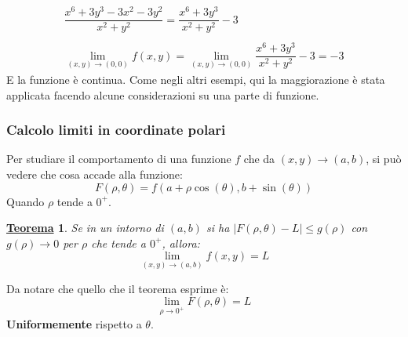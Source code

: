 \documentclass[a4paper]{article}
\newtheorem{theorem}{\textcolor{Red3}{\underline{Teorema}}}
\begin{document}
	\begin{gather*}
		\dfrac{
				x^{6} + 3y^{3} - 3x^{2} - 3y^{2}
		}{x^{2}+y^{2}} = \dfrac{x^{6} + 3y^{3}}{x^{2}+y^{2}} - 3 \\ \\
		\displaystyle\lim_{\left(x,y\right) \rightarrow \left(0,0\right)} f\left(x,y\right) = \displaystyle\lim_{\left(x,y\right) \rightarrow \left(0,0\right)}\dfrac{x^{6} + 3y^{3}}{x^{2}+y^{2}} - 3 = -3
	\end{gather*}
	E la funzione è continua. Come negli altri esempi, qui la maggiorazione è stata applicata facendo alcune considerazioni su una parte di funzione.\newpage

	\subsubsection{Calcolo limiti in coordinate polari}\label{subsubsection: calcolo limiti in coordinate polari}

	Per studiare il comportamento di una funzione $f$ che da $\left(x,y\right) \rightarrow \left(a,b\right)$, si può vedere che cosa accade alla funzione:
	\begin{equation}
		F\left(\rho, \theta\right) = f\left(a + \rho\cos\left(\theta\right), b + \sin\left(\theta\right)\right)
	\end{equation}
	Quando $\rho$ tende a $0^{+}$.
	\begin{theorem}
		Se in un intorno di $\left(a,b\right)$ si ha $\left| F\left(\rho, \theta\right) - L \right| \le g\left(\rho\right)$ con $g\left(\rho\right) \rightarrow 0$ per $\rho$ che tende a $0^{+}$, allora:
		\begin{equation}
			\displaystyle\lim_{\left(x,y\right) \rightarrow \left(a,b\right)} f\left(x,y\right) = L
		\end{equation}
	\end{theorem}

	\noindent
	Da notare che quello che il teorema esprime è:
	\begin{equation*}
		\displaystyle\lim_{\rho \rightarrow 0^{+}} F\left(\rho,\theta\right) = L
	\end{equation*}
	\textbf{Uniformemente} rispetto a $\theta$.\newline
	
\end{document}

